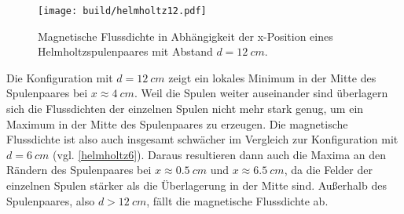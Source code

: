 \begin{figure}[H]
    \texttt{[image: build/helmholtz12.pdf]}
    \caption{Magnetische Flussdichte in Abhängigkeit der x-Position eines Helmholtzspulenpaares mit Abstand $d =\SI{12}{cm}$.}
    \label{helmholtz12}
\end{figure}
Die Konfiguration mit $d = \SI{12}{cm}$ zeigt ein lokales Minimum in der Mitte des Spulenpaares bei $x \approx \SI{4}{cm}$. Weil die Spulen weiter auseinander sind
überlagern sich die Flussdichten der einzelnen Spulen nicht mehr stark genug, um ein Maximum in der Mitte des Spulenpaares zu erzeugen. Die magnetische Flussdichte ist also auch insgesamt schwächer im Vergleich zur Konfiguration mit $d = \SI{6}{cm}$ (vgl. \autoref{helmholtz6}).
Daraus resultieren dann auch die Maxima an den Rändern des Spulenpaares bei $x \approx \SI{0.5}{cm}$ und $x \approx \SI{6.5}{cm}$, da die Felder der einzelnen Spulen stärker als die Überlagerung in der Mitte sind. Außerhalb des Spulenpaares, also $d > \SI{12}{cm}$, fällt die 
magnetische Flussdichte ab.

